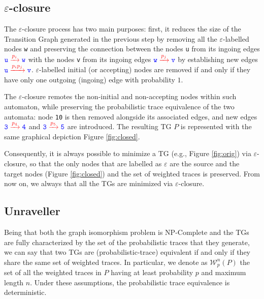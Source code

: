 \subsection{$\varepsilon$-closure}\label{sec:clos}
The $\varepsilon$-closure process has two main purposes: first, it reduces the size of the Transition Graph generated in the previous step by removing all the $\varepsilon$-labelled nodes \texttt{\color{blue}w} and preserving the connection between  the nodes \texttt{\color{blue}u} from its ingoing edges   $\texttt{\color{blue}u}\xrightarrow{\color{red}p_i}\texttt{\color{blue}w}$ with the nodes \texttt{\color{blue}v} from its ingoing edges   $\texttt{\color{blue}w}\xrightarrow{\color{red}p_j}\texttt{\color{blue}v}$ by establishing new edges $\texttt{\color{blue}u}\xrightarrow{\color{red}p_ip_j}\texttt{\color{blue}v}$. $\varepsilon$-labelled initial (or accepting) nodes are removed if and only if they have only one outgoing (ingoing) edge with probability $1$.

\begin{example}
	The $\varepsilon$-closure remotes the non-initial and non-accepting nodes within such automaton, while preserving the probabilistic trace equivalence of the two automata: node \texttt{\color{blue}10} is then removed alongside its associated edges, and new edges $\texttt{\color{blue}3}\xrightarrow{\color{red}p_4}\texttt{\color{blue}4}$ and $\texttt{\color{blue}3}\xrightarrow{\color{red}p_5}\texttt{\color{blue}5}$ are introduced. The resulting TG $P$ is represented with the same graphical depiction Figure \ref{fig:closed}.
\end{example}

Consequently, it is always possible to minimize a TG  (e.g., Figure \ref{fig:orig}) via $\varepsilon$-closure, so that the only nodes that are labelled as $\varepsilon$ are the source and the target nodes (Figure \ref{fig:closed}) and the set of weighted traces is preserved. From now on, we always that all the TGs are minimized via $\varepsilon$-closure. 

\subsection{Unraveller}\label{sec:unrav}
Being that both the graph isomorphism problem is NP-Complete and the TGs are fully characterized by the set of the probabilistic traces that they generate,  we can say that two TGs are (probabilistic-trace) equivalent if and only if they share the same set of weighted traces. In particular, we denote as $\mathcal{W}_p^n(P)$ the set of all the weighted traces in $P$ having at least probability $p$ and maximum length $n$. Under these assumptions, the probabilistic trace equivalence is deterministic.

